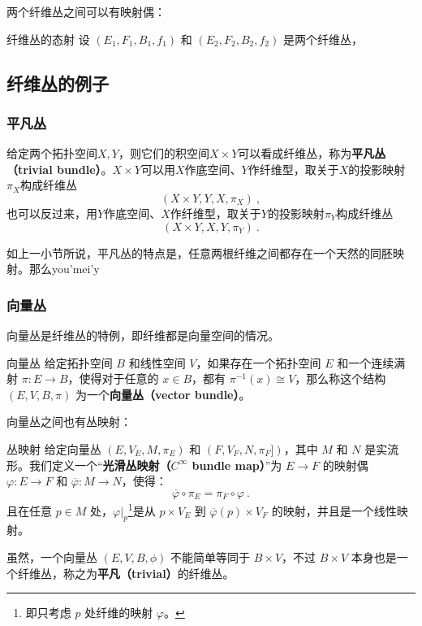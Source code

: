 两个纤维丛之间可以有映射偶：

\begin{definition}{纤维丛的态射}
设 $(E_1, F_1, B_1, f_1)$ 和 $(E_2, F_2, B_2, f_2)$ 是两个纤维丛，
\end{definition}

\subsection{纤维丛的例子}

\subsubsection{平凡丛}


给定两个拓扑空间$X, Y$，则它们的积空间$X\times Y$可以看成纤维丛，称为\textbf{平凡丛（trivial bundle）}。$X\times Y$可以用$X$作底空间、$Y$作纤维型，取关于$X$的投影映射$\pi_X$构成纤维丛
\begin{equation}
(X\times Y, Y, X, \pi_X)~, 
\end{equation}
也可以反过来，用$Y$作底空间、$X$作纤维型，取关于$Y$的投影映射$\pi_Y$构成纤维丛
\begin{equation}
(X\times Y, X, Y, \pi_Y)~. 
\end{equation}

如上一小节所说，平凡丛的特点是，任意两根纤维之间都存在一个天然的同胚映射。那么you'mei'y









\subsubsection{向量丛}


向量丛是纤维丛的特例，即纤维都是向量空间的情况。

\begin{definition}{向量丛}
给定拓扑空间 $B$ 和线性空间 $V$，如果存在一个拓扑空间 $E$ 和一个连续满射 $\pi:E\rightarrow B$，使得对于任意的 $x\in B$，都有 $\pi^{-1}(x)\cong V$，那么称这个结构 $(E, V, B, \pi)$ 为一个\textbf{向量丛（vector bundle）}。
\end{definition}

向量丛之间也有丛映射：

\begin{definition}{丛映射}
给定向量丛 $(E, V_E, M, \pi_E)$ 和 $(F, V_F, N, \pi_F])$，其中 $M$ 和 $N$ 是实流形。我们定义一个“\textbf{光滑丛映射（$C^\infty$ bundle map）}”为 $E\rightarrow F$ 的映射偶 $\varphi: E\rightarrow F$ 和 $\overline{\varphi}: M\rightarrow N$，使得：
\begin{equation}
\overline{\varphi}\circ\pi_E=\pi_F\circ\varphi~.
\end{equation}
且在任意 $p\in M$ 处，$\varphi|_p$\footnote{即只考虑 $p$ 处纤维的映射 $\varphi$。}是从 $p\times V_E$ 到 $\overline{\varphi}(p)\times V_F$ 的映射，并且是一个线性映射。
\end{definition}

虽然，一个向量丛 $(E, V, B, \phi)$ 不能简单等同于 $B\times V$，不过 $B\times V$ 本身也是一个纤维丛，称之为\textbf{平凡（trivial）}的纤维丛。




